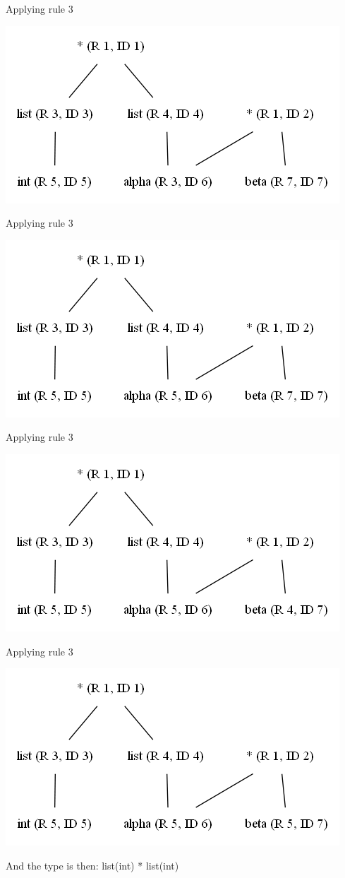 \documentclass[12pt]{article}
\begin{document}
Applying rule 3
\begin{center}
\includegraphics[scale=0.6]{graph3}
\end{center}
Applying rule 3
\begin{center}
\includegraphics[scale=0.6]{graph4}
\end{center}
Applying rule 3
\begin{center}
\includegraphics[scale=0.6]{graph5}
\end{center}
Applying rule 3
\begin{center}
\includegraphics[scale=0.6]{graph6}
\end{center}
And the type is then: list(int) * list(int)
\end{document}
